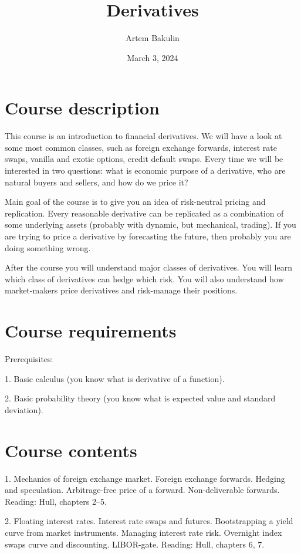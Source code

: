 \documentclass[a4paper,14pt]{extarticle}
\title{Derivatives}
\author{Artem Bakulin}
\date{March 3, 2024}
\begin{document}
\maketitle

\section*{Course description}
This course is an introduction to financial derivatives. We will have a look at some most common
classes, such as foreign exchange forwards, interest rate swaps, vanilla and exotic options, credit
default swaps. Every time we will be interested in two questions: what is economic purpose of a
derivative, who are natural buyers and sellers, and how do we price it?

Main goal of the course is to give you an idea of risk-neutral pricing and replication. Every
reasonable derivative can be replicated as a combination of some underlying assets (probably
with dynamic, but mechanical, trading). If you are trying to price a derivative by forecasting the
future, then probably you are doing something wrong.

After the course you will understand major classes of derivatives. You will learn which class of
derivatives can hedge which risk. You will also understand how market-makers price derivatives
and risk-manage their positions.

\section*{Course requirements}

Prerequisites:

1. Basic calculus (you know what is derivative of a function).

2. Basic probability theory (you know what is expected value and standard deviation).

\section*{Course contents}

1. Mechanics of foreign exchange market. Foreign exchange forwards. Hedging and speculation.
Arbitrage-free price of a forward. Non-deliverable forwards.
Reading: Hull, chapters 2--5.

2. Floating interest rates. Interest rate swaps and futures. Bootstrapping a yield curve from
market instruments. Managing interest rate risk. Overnight index swaps curve and discounting.
LIBOR-gate.
Reading: Hull, chapters 6, 7.
\end{document}
